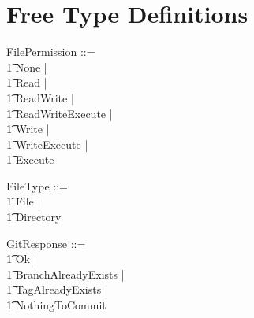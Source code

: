 \section{Free Type Definitions}

\begin{zed}
  FilePermission ::= \\
  \t1 None | \\
  \t1 Read | \\
  \t1 ReadWrite | \\
  \t1 ReadWriteExecute | \\
  \t1 Write | \\
  \t1 WriteExecute | \\
  \t1 Execute
\end{zed}

\begin{zed}
  FileType ::= \\
  \t1 File | \\
  \t1 Directory
\end{zed}

\begin{zed}
  GitResponse ::= \\
  \t1 Ok | \\
  \t1 BranchAlreadyExists | \\
  \t1 TagAlreadyExists | \\
  \t1 NothingToCommit
\end{zed}


